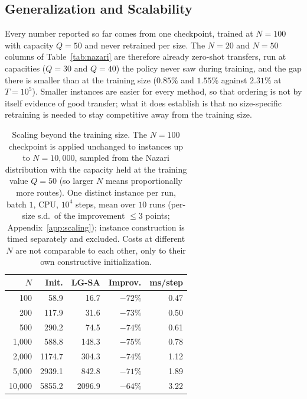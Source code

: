 \documentclass[letterpaper]{article} %
\begin{document}


\subsection{Generalization and Scalability}
\label{sec:scaling}

Every number reported so far comes from one checkpoint, trained at $N = 100$ with capacity $Q = 50$ and never retrained per size. The $N = 20$ and $N = 50$ columns of Table~\ref{tab:nazari} are therefore already zero-shot transfers, run at capacities ($Q = 30$ and $Q = 40$) the policy never saw during training, and the gap there is smaller than at the training size ($0.85\%$ and $1.55\%$ against $2.31\%$ at $T = 10^{5}$). Smaller instances are easier for every method, so that ordering is not by itself evidence of good transfer; what it does establish is that no size-specific retraining is needed to stay competitive away from the training size.

\begin{table}[t]
\centering
\small
\setlength{\tabcolsep}{5pt}
\begin{tabular}{@{}r rr r r@{}}
\toprule
$N$ & Init. & LG-SA & Improv. & ms/step \\
\midrule
100     & 58.9    & 16.7    & $-72\%$ & 0.47 \\
200     & 117.9   & 31.6    & $-73\%$ & 0.50 \\
500     & 290.2   & 74.5    & $-74\%$ & 0.61 \\
1{,}000  & 588.8   & 148.3   & $-75\%$ & 0.78 \\
2{,}000  & 1174.7  & 304.3   & $-74\%$ & 1.12 \\
5{,}000  & 2939.1  & 842.8   & $-71\%$ & 1.89 \\
10{,}000 & 5855.2  & 2096.9  & $-64\%$ & 3.22 \\
\bottomrule
\end{tabular}
\caption{Scaling beyond the training size. The $N = 100$ checkpoint is applied unchanged to instances up to $N = 10{,}000$, sampled from the Nazari distribution with the capacity held at the training value $Q = 50$ (so larger $N$ means proportionally more routes). One distinct instance per run, batch $1$, CPU, $10^{4}$ steps, mean over $10$ runs (per-size s.d.\ of the improvement $\le 3$ points; Appendix~\ref{app:scaling}); instance construction is timed separately and excluded. Costs at different $N$ are not comparable to each other, only to their own constructive initialization.}
\label{tab:dims}
\end{table}
\end{document}
